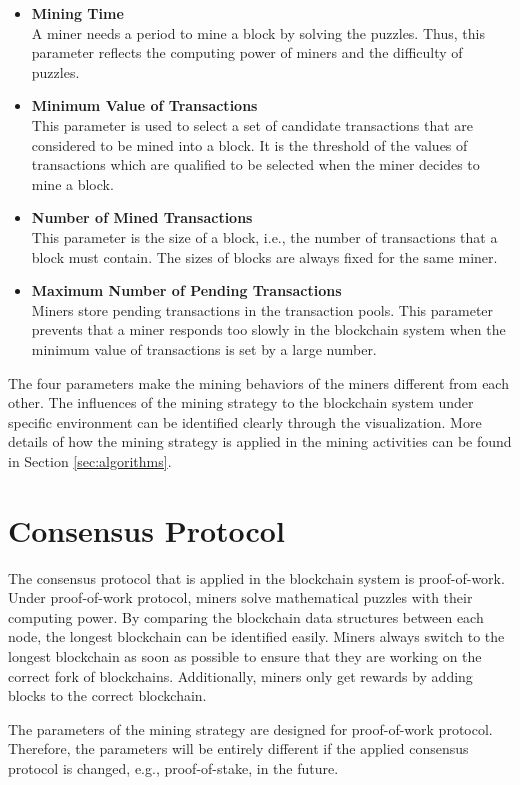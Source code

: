 \begin{itemize}
    \item \textbf{Mining Time} \\
        A miner needs a period to mine a block by solving the puzzles. Thus, this parameter reflects the computing power of miners and the difficulty of puzzles.
    \item \textbf{Minimum Value of Transactions} \\
        This parameter is used to select a set of candidate transactions that are considered to be mined into a block. It is the threshold of the values of transactions which are qualified to be selected when the miner decides to mine a block.
    \item \textbf{Number of Mined Transactions} \\
        This parameter is the size of a block, i.e., the number of transactions that a block must contain. The sizes of blocks are always fixed for the same miner.
    \item \textbf{Maximum Number of Pending Transactions} \\
        Miners store pending transactions in the transaction pools. This parameter prevents that a miner responds too slowly in the blockchain system when the minimum value of transactions is set by a large number.
\end{itemize}

The four parameters make the mining behaviors of the miners different from each other. The influences of the mining strategy to the blockchain system under specific environment can be identified clearly through the visualization. More details of how the mining strategy is applied in the mining activities can be found in Section \ref{sec:algorithms}.

\section{Consensus Protocol}

The consensus protocol that is applied in the blockchain system is proof-of-work. Under proof-of-work protocol, miners solve mathematical puzzles with their computing power. By comparing the blockchain data structures between each node, the longest blockchain can be identified easily. Miners always switch to the longest blockchain as soon as possible to ensure that they are working on the correct fork of blockchains. Additionally, miners only get rewards by adding blocks to the correct blockchain.

The parameters of the mining strategy are designed for proof-of-work protocol. Therefore, the parameters will be entirely different if the applied consensus protocol is changed, e.g., proof-of-stake, in the future.